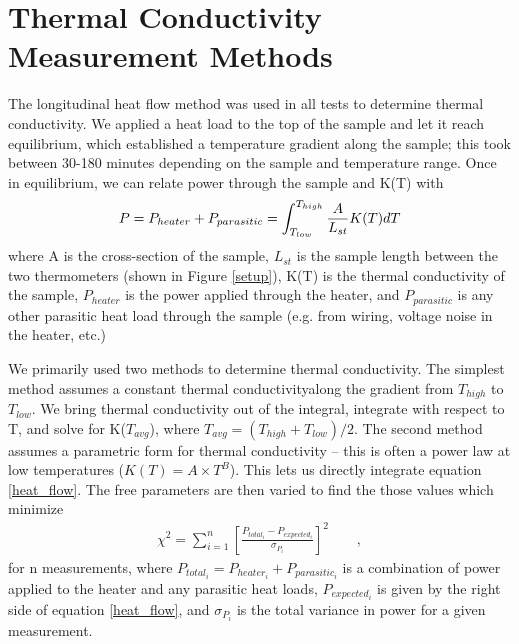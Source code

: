 \documentclass[final]{svjour2}
\begin{document}
\section{Thermal Conductivity Measurement Methods}
The longitudinal heat flow method was used in all tests to determine thermal conductivity. We applied a heat load to the top of the sample and let it reach equilibrium, which established a temperature gradient along the sample; this took between 30-180 minutes depending on the sample and temperature range. Once in equilibrium, we can relate power through the sample and K(T) with
\begin{equation}
P = P_{heater} + P_{parasitic} = \int_{T_{low}}^{T_{high}} \frac{A}{L_{st}} K(T)dT\\
\label{heat_flow}
\end{equation}
where A is the cross-section of the sample, $L_{st}$ is the sample length between the two thermometers (shown in Figure \ref{setup}), K(T) is the thermal conductivity of the sample, $P_{heater}$ is the power applied through the heater, and $P_{parasitic}$ is any other parasitic heat load through the sample (e.g. from wiring, voltage noise in the heater, etc.)

We primarily used two methods to determine thermal conductivity. The simplest method assumes a constant thermal conductivity\footnotemark along the gradient from $T_{high}$ to $T_{low}$. We bring thermal conductivity out of the integral, integrate with respect to T, and solve for K($T_{avg}$), where $T_{avg} = (T_{high} + T_{low})/2$. The second method assumes a parametric form for thermal conductivity -- this is often a power law at low temperatures ($K(T) = A \times T^B$). This lets us directly integrate equation \ref{heat_flow}. The free parameters are then varied to find the those values which minimize
\begin{eqnarray}
\chi^2 = \sum_{i = 1}^{n} \left[\frac{P_{total_i} - P_{expected_i}}{\sigma_{P_i}}\right]^2 \qquad ,
\label{param}
\end{eqnarray}
for n measurements, where $P_{total_i} = P_{heater_i} + P_{parasitic_i}$ is a combination of power applied to the heater and any parasitic heat loads, $P_{expected_i}$ is given by the right side of equation \ref{heat_flow}, and $\sigma_{P_i}$ is the total variance in power for a given measurement.
\end{document}
